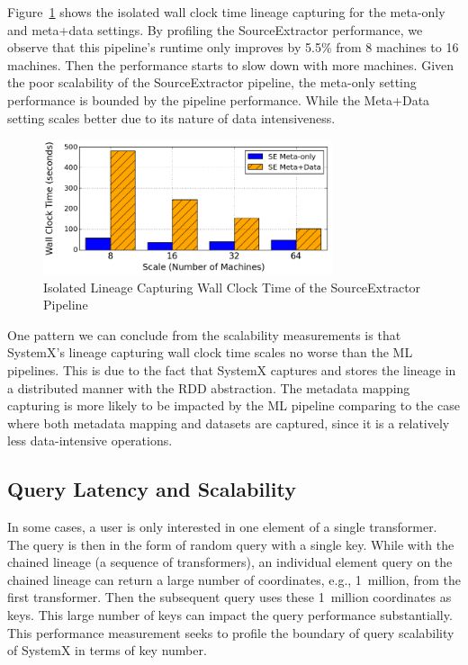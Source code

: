 \documentclass{sig-alternate}
\begin{document}
Figure~\ref{fig:SE-overhead} shows the isolated wall clock time lineage capturing for the meta-only and meta+data settings.
By profiling the SourceExtractor performance, we observe that this pipeline's runtime only improves by 5.5\% from 8 machines
to 16 machines. Then the performance starts to slow down with more machines.
Given the poor scalability of the SourceExtractor pipeline, the meta-only setting performance is bounded by the pipeline performance.
While the Meta+Data setting scales better due to its nature of data intensiveness.
\begin{figure}[t]
\begin{center}
    \includegraphics[width=85mm]{pictures/Overhead-Time-SE}
\caption {Isolated Lineage Capturing Wall Clock Time of the SourceExtractor Pipeline
    \label{fig:SE-overhead}
}
\end{center}
\end{figure}

One pattern we can conclude from the scalability measurements is that SystemX's lineage capturing wall clock time scales no worse than the ML pipelines.
This is due to the fact that SystemX captures and stores the lineage in a distributed manner with the RDD abstraction. 
The metadata mapping capturing is more likely to be impacted by the ML pipeline comparing to the case where both metadata
mapping and datasets are captured, since it is a relatively less data-intensive operations.


\subsection{Query Latency and Scalability}
In some cases, a user is only interested in one element of a single transformer.
The query is then in the form of random query with a single key.
While with the chained lineage (a sequence of transformers), an individual element query 
on the chained lineage can return a large number of coordinates, e.g., 1~million, from
the first transformer. 
Then the subsequent query uses these 1~million coordinates as keys.
This large number of keys can impact the query performance substantially.  
This performance measurement seeks to profile the boundary of query scalability of SystemX in terms of key number. 
\end{document}
